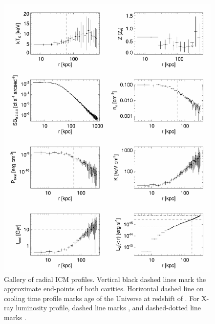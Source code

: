\begin{figure}
  \begin{center}
    \begin{minipage}{\linewidth}
      \includegraphics*[width=\textwidth]{arx_r797_nhfro.eps}
      \caption{Gallery of radial ICM profiles. Vertical black dashed
        lines mark the approximate end-points of both
        cavities. Horizontal dashed line on cooling time profile marks
        age of the Universe at redshift of \rbs. For X-ray luminosity
        profile, dashed line marks \lcool, and dashed-dotted line
        marks \pcav.}
      \label{fig:gallery}
    \end{minipage}
  \end{center}
\end{figure}

